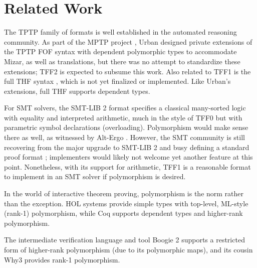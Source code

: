 \section{Related Work}
\label{sec_related}

The TPTP family of formats is well established in the automated reasoning
community. As part of the MPTP project \cite{urban-2006}, Urban designed private
extensions of the TPTP FOF syntax with dependent polymorphic types to
accommodate Mizar, as well as translations, but there was no attempt to
standardize these extensions; TFF2 is expected to subsume this work. Also
related to TFF1 is the full THF syntax \cite{sutcliffe-benzmueller-2010}, which
is not yet finalized or implemented. Like Urban's extensions, full THF supports
dependent types.

For SMT solvers, the SMT-LIB 2 format \cite{barrett-et-al-2010} specifies a
classical many-sorted logic with equality and interpreted arithmetic, much in
the style of TFF0 but with parametric symbol declarations (overloading).
Polymorphism would make sense there as well, as witnessed by Alt-Ergo
\cite{bobot-et-al-2008}.
However, the SMT community is still recovering from the major
upgrade to SMT-LIB 2 and busy defining a standard proof format
\cite{besson-et-al-2011}; implementers would likely not welcome yet another
feature at this point. Nonetheless, with its support for arithmetic, TFF1 is a
reasonable format to implement in an SMT solver if polymorphism is desired.

In the world of interactive theorem proving, polymorphism is the norm rather
than the exception. HOL systems \cite{gordon-melham-1993} provide simple types
with top-level, ML-style (rank-1) polymorphism, while Coq
\cite{bertot-casteran-2004} supports dependent types and higher-rank
polymorphism.

The intermediate verification language and tool Boogie 2 \cite{leino-ruemmer-2010}
supports a restricted form of higher-rank polymorphism (due to its polymorphic maps),
and its cousin Why3 \cite{bobot-et-al-2011}
provides rank-1 polymorphism.%

